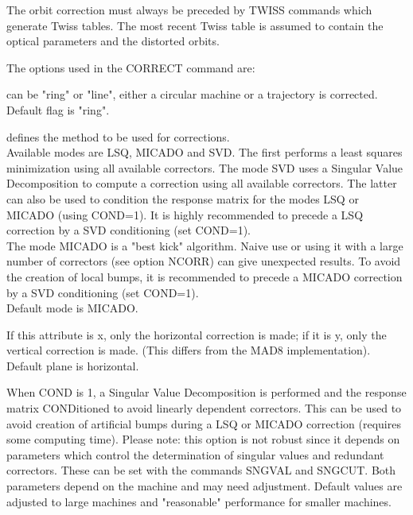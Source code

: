 The orbit correction must always be preceded by TWISS commands  which
generate Twiss tables. The most recent Twiss table is assumed to contain
the optical parameters and the distorted orbits. 

The options used in the CORRECT command are: 

\begin{madlist}
    can be "ring" or "line", either a circular machine
     or a trajectory is corrected.   
     \\ Default flag is "ring". 

    defines the method to be used for corrections. 
     \\ Available modes are LSQ, MICADO and SVD.  The first performs a
     least squares minimization using all available correctors. The mode
     SVD uses a Singular Value Decomposition to compute a correction
     using all available correctors. The latter can also be used to
     condition the response matrix for the modes LSQ or MICADO (using
     COND=1). It is highly recommended to precede a LSQ correction by a
     SVD conditioning (set COND=1).  
     \\ The mode MICADO is a "best kick" algorithm. Naive use or using
     it with a large number of correctors (see option NCORR) can give
     unexpected results. To avoid the creation of local bumps, it is
     recommended to precede a MICADO correction by a SVD conditioning
     (set COND=1).  
     \\ Default mode is MICADO.            

    If this attribute is x, only the horizontal correction
     is made; if it is y, only the vertical correction is made. (This
     differs from the MAD8 implementation).  
     \\ Default plane is horizontal. 

    When COND is 1, a Singular Value Decomposition is
     performed and  the response matrix CONDitioned to avoid linearly
     dependent correctors. This can be used to avoid creation of
     artificial bumps during a LSQ or MICADO correction (requires some
     computing time).  Please note: this option is not robust since it
     depends on parameters which control the determination of singular
     values and redundant correctors. These can be set with the commands
     SNGVAL and SNGCUT. Both parameters depend on the machine and may
     need adjustment. Default values are adjusted to large machines and
     "reasonable" performance for smaller machines.  
     \\


\end{madlist}
